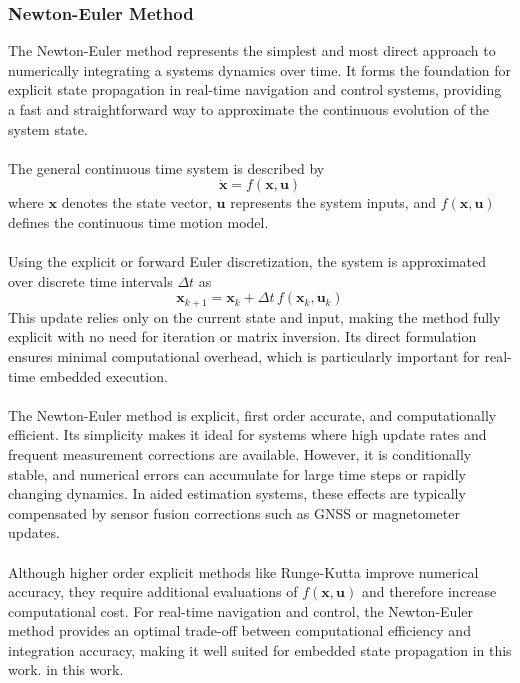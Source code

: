 \subsubsection{Newton-Euler Method}
The Newton-Euler method represents the simplest and most direct approach to numerically integrating a systems dynamics over time. It forms the foundation for explicit state propagation in real-time navigation and control systems, providing a fast and straightforward way to approximate the continuous evolution of the system state.  
\\ \\
The general continuous time system is described by
$$
    \dot{\mathbf{x}} = f(\mathbf{x}, \mathbf{u})
$$
where $\mathbf{x}$ denotes the state vector, $\mathbf{u}$ represents the system inputs, and $f(\mathbf{x}, \mathbf{u})$ defines the continuous time motion model.  
\\ \\
Using the explicit or forward Euler discretization, the system is approximated over discrete time intervals $\Delta t$ as
$$
    \mathbf{x}_{k+1} = \mathbf{x}_k + \Delta t\,f(\mathbf{x}_k, \mathbf{u}_k)
$$
This update relies only on the current state and input, making the method fully explicit with no need for iteration or matrix inversion. Its direct formulation ensures minimal computational overhead, which is particularly important for real-time embedded execution.  
\\ \\
The Newton-Euler method is explicit, first order accurate, and computationally efficient. Its simplicity makes it ideal for systems where high update rates and frequent measurement corrections are available. However, it is conditionally stable, and numerical errors can accumulate for large time steps or rapidly changing dynamics. In aided estimation systems, these effects are typically compensated by sensor fusion corrections such as GNSS or magnetometer updates.  
\\ \\
Although higher order explicit methods like Runge-Kutta improve numerical accuracy, they require additional evaluations of $f(\mathbf{x}, \mathbf{u})$ and therefore increase computational cost. For real-time navigation and control, the Newton-Euler method provides an optimal trade-off between computational efficiency and integration accuracy, making it well suited for embedded state propagation in this work.
in this work.



